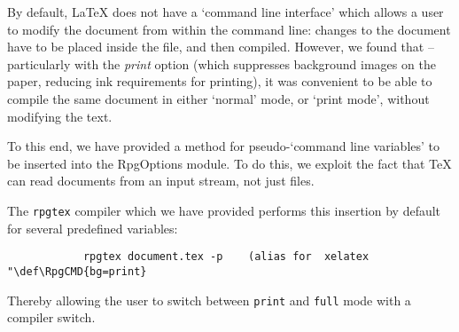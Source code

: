 		By default, \LaTeX{} does not have a `command line interface' which allows a user to modify the document from within the command line: changes to the document have to be placed inside the file, and then compiled. However, we found that -- particularly with the \textit{print} option (which suppresses background images on the paper, reducing ink requirements for printing), it was convenient to be able to compile the same document in either `normal' mode, or `print mode', without modifying the text.

		To this end, we have provided a method for pseudo-`command line variables' to be inserted into the RpgOptions module. To do this, we exploit the fact that \TeX{} can read documents from an input stream, not just files.


		\begin{macrolist}
		\end{macrolist}

		The \verb|rpgtex| compiler which we have provided  performs this insertion by default for several predefined variables:

		\begin{lstlisting}
			rpgtex document.tex -p    (alias for  xelatex "\def\RpgCMD{bg=print} 
		\end{lstlisting}

		Thereby allowing the user to switch between \verb|print| and \verb|full| mode with a compiler switch.

		
